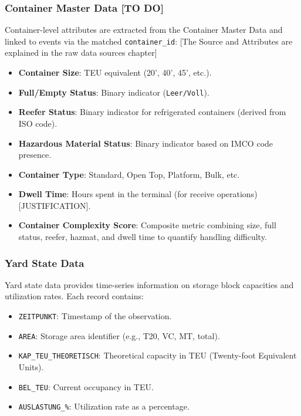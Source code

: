         \subsubsection{Container Master Data [TO DO]}

        Container-level attributes are extracted from the Container Master Data and linked to events via the matched \texttt{container\_id}: [The Source and Attributes are explained in the raw data sources chapter]
        
        \begin{itemize}
            \item \textbf{Container Size}: TEU equivalent (20', 40', 45', etc.).
            \item \textbf{Full/Empty Status}: Binary indicator (\texttt{Leer/Voll}).
            \item \textbf{Reefer Status}: Binary indicator for refrigerated containers (derived from ISO code).
            \item \textbf{Hazardous Material Status}: Binary indicator based on IMCO code presence.
            \item \textbf{Container Type}: Standard, Open Top, Platform, Bulk, etc.
            \item \textbf{Dwell Time}: Hours spent in the terminal (for receive operations) [JUSTIFICATION].
            \item \textbf{Container Complexity Score}: Composite metric combining size, full status, reefer, hazmat, and dwell time to quantify handling difficulty.
        \end{itemize}
        
        \subsubsection{Yard State Data}

        Yard state data provides time-series information on storage block capacities and utilization rates. Each record contains:
        
        \begin{itemize}
            \item \texttt{ZEITPUNKT}: Timestamp of the observation.
            \item \texttt{AREA}: Storage area identifier (e.g., T20, VC, MT, total).
            \item \texttt{KAP\_TEU\_THEORETISCH}: Theoretical capacity in TEU (Twenty-foot Equivalent Units).
            \item \texttt{BEL\_TEU}: Current occupancy in TEU.
            \item \texttt{AUSLASTUNG\_\%}: Utilization rate as a percentage.
        \end{itemize}
        
